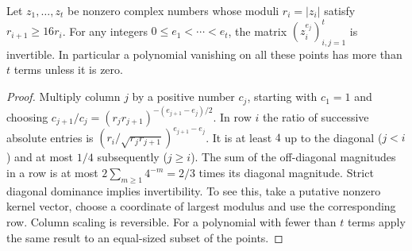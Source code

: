 \begin{lemma}
Let $z_1,\ldots,z_t$ be nonzero complex numbers whose moduli $r_i=|z_i|$
satisfy $r_{i+1}\ge16r_i$. For any integers $0\le e_1<\cdots<e_t$,
the matrix $(z_i^{e_j})_{i,j=1}^t$ is invertible. In particular a polynomial
vanishing on all these points has more than $t$ terms unless it is zero.
\end{lemma}
\begin{proof}
Multiply column $j$ by a positive number $c_j$, starting with $c_1=1$ and
choosing $c_{j+1}/c_j=(r_jr_{j+1})^{-(e_{j+1}-e_j)/2}$.
In row $i$ the ratio of successive absolute entries is
$(r_i/\sqrt{r_jr_{j+1}})^{e_{j+1}-e_j}$. It is at least $4$ up to the
diagonal ($j<i$) and at most $1/4$ subsequently ($j\ge i$). The sum of the
off-diagonal magnitudes in a row is at most $2\sum_{m\ge1}4^{-m}=2/3$
times its diagonal magnitude. Strict diagonal dominance implies
invertibility. To see this, take a putative nonzero kernel vector, choose a coordinate of
largest modulus and use the corresponding row. Column scaling is reversible.
For a polynomial with fewer than $t$ terms apply the same result to an
equal-sized subset of the points.
\end{proof}

